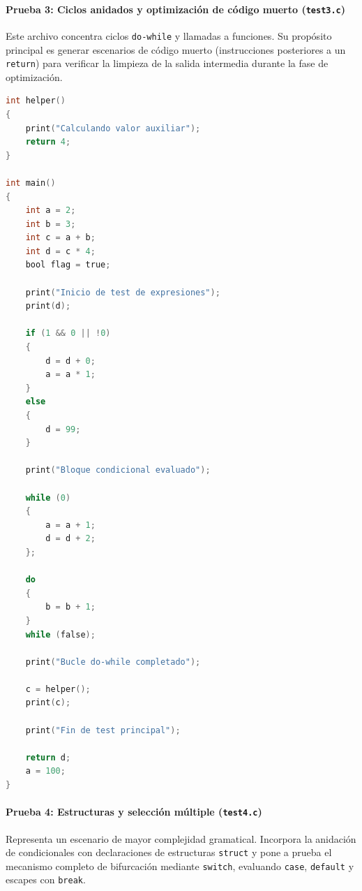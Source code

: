 \documentclass[12pt]{article}
\begin{document}
\paragraph{Prueba 3: Ciclos anidados y optimización de código muerto (\texttt{test3.c})}
Este archivo concentra ciclos \texttt{do-while} y llamadas a funciones. Su propósito principal es generar escenarios de código muerto (instrucciones posteriores a un \texttt{return}) para verificar la limpieza de la salida intermedia durante la fase de optimización.

\begin{lstlisting}[language=C, caption={Contenido de test3.c}]
int helper()
{
    print("Calculando valor auxiliar");
    return 4;
}

int main()
{
    int a = 2;
    int b = 3;
    int c = a + b;
    int d = c * 4;
    bool flag = true;

    print("Inicio de test de expresiones");
    print(d);

    if (1 && 0 || !0)
    {
        d = d + 0;
        a = a * 1;
    }
    else
    {
        d = 99;
    }

    print("Bloque condicional evaluado");

    while (0)
    {
        a = a + 1;
        d = d + 2;
    };

    do
    {
        b = b + 1;
    }
    while (false);

    print("Bucle do-while completado");

    c = helper();
    print(c);

    print("Fin de test principal");

    return d;
    a = 100;
}
\end{lstlisting}

\paragraph{Prueba 4: Estructuras y selección múltiple (\texttt{test4.c})}
Representa un escenario de mayor complejidad gramatical. Incorpora la anidación de condicionales con declaraciones de estructuras \texttt{struct} y pone a prueba el mecanismo completo de bifurcación mediante \texttt{switch}, evaluando \texttt{case}, \texttt{default} y escapes con \texttt{break}.
\end{document}
